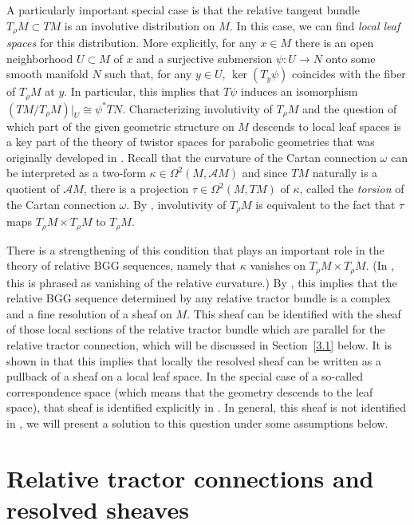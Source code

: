 \documentclass[10pt,a4paper]{amsart}
\numberwithin{equation}{section}
\def\Cal{\mathcal}
\newcommand{\x}{\times}
\newcommand{\ka}{\kappa}
\newcommand{\om}{\omega}
\newcommand{\ps}{\psi}
\newcommand{\Om}{\Omega}
\begin{document}
A particularly important special case is that the relative tangent bundle $T_\rho
M\subset TM$ is an involutive distribution on $M$. In this case, we can find
\textit{local leaf spaces} for this distribution. More explicitly, for any $x\in M$
there is an open neighborhood $U\subset M$ of $x$ and a surjective submersion
$\ps\colon U\to N$ onto some smooth manifold $N$ such that, for any $y\in U$,
$\ker(T_y\ps)$ coincides with the fiber of $T_\rho M$ at $y$. In particular, this
implies that $T\ps$ induces an isomorphism $(TM/T_\rho
M)|_U\cong\psi^*TN$. Characterizing involutivity of $T_\rho M$ and the question of
which part of the given geometric structure on $M$ descends to local leaf spaces is a
key part of the theory of twistor spaces for parabolic geometries that was originally
developed in \cite{twistor}. Recall that the curvature of the Cartan connection $\om$
can be interpreted as a two-form $\ka\in\Om^2(M,\Cal AM)$ and since $TM$ naturally is
a quotient of $\Cal AM$, there is a projection $\tau\in\Om^2(M,TM)$ of $\ka$, called
the \textit{torsion} of the Cartan connection $\om$. By \cite[Proposition 4.6]{Rel-BGG2},
involutivity of $T_\rho M$ is equivalent to the fact that $\tau$
maps $T_\rho M\x T_\rho M$ to $T_\rho M$.

There is a strengthening of this condition that plays an important role in the theory
of relative BGG sequences, namely that $\ka$ vanishes on $T_\rho M\x T_\rho M$. (In
\cite{Rel-BGG2}, this is phrased as vanishing of the relative curvature.) By \cite[Theorem 4.11]{Rel-BGG2},
this implies that the relative BGG sequence determined by
any relative tractor bundle is a complex and a fine resolution of a sheaf on
$M$. This sheaf can be identified with the sheaf of those local sections of the
relative tractor bundle which are parallel for the relative tractor connection, which
will be discussed in Section~\ref{3.1} below. It is shown in \cite[Section 4.7]{Rel-BGG2}
that this implies that locally the resolved sheaf can be written as a pullback of a
sheaf on a local leaf space. In the special case of a so-called correspondence space
(which means that the geometry descends to the leaf space), that sheaf is identified
explicitly in \cite[Theorem 4.11]{Rel-BGG2}. In general, this sheaf is not
identified in \cite{Rel-BGG2}, we will present a solution to this question under some
assumptions below.

\section{Relative tractor connections and resolved sheaves}\label{3}
\end{document}
